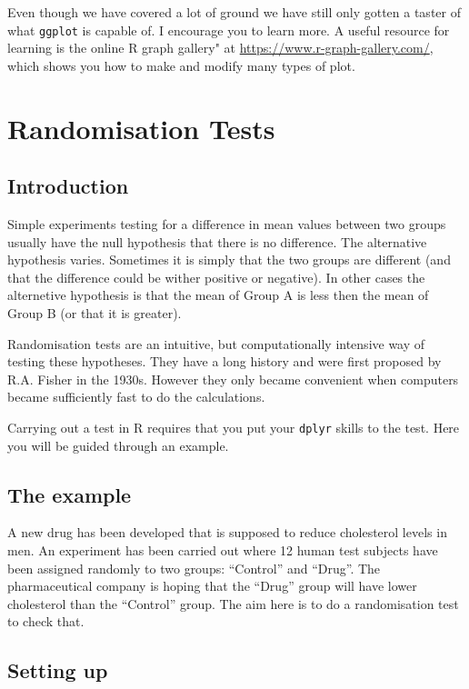\documentclass[
  a4paperpaper,
]{book}
\begin{document}
Even though we have covered a lot of ground we have still only gotten a taster of what \texttt{ggplot} is capable of. I encourage you to learn more. A useful resource for learning is the online R graph gallery" at \url{https://www.r-graph-gallery.com/}, which shows you how to make and modify many types of plot.

\hypertarget{randomisation-tests}{%
\chapter{Randomisation Tests}\label{randomisation-tests}}

\hypertarget{introduction}{%
\section{Introduction}\label{introduction}}

Simple experiments testing for a difference in mean values between two groups usually have the null hypothesis that there is no difference. The alternative hypothesis varies. Sometimes it is simply that the two groups are different (and that the difference could be wither positive or negative). In other cases the alternetive hypothesis is that the mean of Group A is less then the mean of Group B (or that it is greater).

Randomisation tests are an intuitive, but computationally intensive way of testing these hypotheses. They have a long history and were first proposed by R.A. Fisher in the 1930s. However they only became convenient when computers became sufficiently fast to do the calculations.

Carrying out a test in R requires that you put your \texttt{dplyr} skills to the test. Here you will be guided through an example.

\hypertarget{the-example}{%
\section{The example}\label{the-example}}

A new drug has been developed that is supposed to reduce cholesterol levels in men. An experiment has been carried out where 12 human test subjects have been assigned randomly to two groups: ``Control'' and ``Drug''. The pharmaceutical company is hoping that the ``Drug'' group will have lower cholesterol than the ``Control'' group. The aim here is to do a randomisation test to check that.

\hypertarget{setting-up}{%
\section{Setting up}\label{setting-up}}
\end{document}
